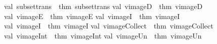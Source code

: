 \begin{isabellebody}
val\ subset{\isacharunderscore}{\kern0pt}trans\ {\isacharequal}{\kern0pt}\ {\isacharat}{\kern0pt}{\isacharbraceleft}{\kern0pt}thm\ subset{\isacharunderscore}{\kern0pt}trans{\isacharbraceright}{\kern0pt}\isanewline
val\ vimageD\ {\isacharequal}{\kern0pt}\ {\isacharat}{\kern0pt}{\isacharbraceleft}{\kern0pt}thm\ vimageD{\isacharbraceright}{\kern0pt}\isanewline
val\ vimageE\ {\isacharequal}{\kern0pt}\ {\isacharat}{\kern0pt}{\isacharbraceleft}{\kern0pt}thm\ vimageE{\isacharbraceright}{\kern0pt}\isanewline
val\ vimageI\ {\isacharequal}{\kern0pt}\ {\isacharat}{\kern0pt}{\isacharbraceleft}{\kern0pt}thm\ vimageI{\isacharbraceright}{\kern0pt}\isanewline
val\ vimageI{}\ {\isacharequal}{\kern0pt}\ {\isacharat}{\kern0pt}{\isacharbraceleft}{\kern0pt}thm\ vimageI{}{\isacharbraceright}{\kern0pt}\isanewline
val\ vimage{\isacharunderscore}{\kern0pt}Collect\ {\isacharequal}{\kern0pt}\ {\isacharat}{\kern0pt}{\isacharbraceleft}{\kern0pt}thm\ vimage{\isacharunderscore}{\kern0pt}Collect{\isacharbraceright}{\kern0pt}\isanewline
val\ vimage{\isacharunderscore}{\kern0pt}Int\ {\isacharequal}{\kern0pt}\ {\isacharat}{\kern0pt}{\isacharbraceleft}{\kern0pt}thm\ vimage{\isacharunderscore}{\kern0pt}Int{\isacharbraceright}{\kern0pt}\isanewline
val\ vimage{\isacharunderscore}{\kern0pt}Un\ {\isacharequal}{\kern0pt}\ {\isacharat}{\kern0pt}{\isacharbraceleft}{\kern0pt}thm\ vimage{\isacharunderscore}{\kern0pt}Un{\isacharbraceright}{\kern0pt}\isanewline
{\isacartoucheclose}%
\endisatagML
{\isafoldML}%
%
\isadelimML
\isanewline
%
\endisadelimML
%
\isadelimtheory
\isanewline
%
\endisadelimtheory
%
\isatagtheory
{}\isamarkupfalse%
%
\endisatagtheory
{\isafoldtheory}%
%
\isadelimtheory
%
\endisadelimtheory
%
\end{isabellebody}%
\endinput
